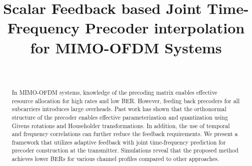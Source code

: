 \documentclass[journal,10pt,twocolumn]{IEEEtran}
\begin{document}

\title{Scalar Feedback based Joint Time-Frequency Precoder
  interpolation for  MIMO-OFDM Systems}



 \author{
 \
}
\maketitle

\thispagestyle{plain}



\begin{abstract}

  In MIMO-OFDM systems, knowledge of the precoding matrix enables
  effective resource allocation for high rates and low BER. However,
  feeding back precoders for all subcarriers introduces large
  overheads. Past work has shown that the orthonormal structure of the
  precoder enables effective parameterization and quantization using
  Givens rotations and Householder transformations. In addition, the
  use of temporal and frequency correlations can further reduce the
  feedback requirements.  We present a framework that utilizes
  adaptive feedback with joint time-frequency prediction for precoder
  construction at the transmitter.  Simulations reveal that the
  proposed method achieves lower BERs for various channel profiles
  compared to other approaches.
\end{abstract}
\end{document}
